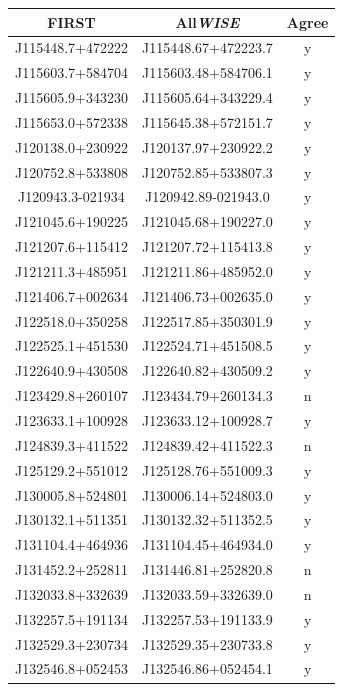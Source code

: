 \begin{table}
    \scriptsize\centering
  \begin{tabular}{ccc}
        \hline\hline
        FIRST & All\emph{WISE} & Agree\\\hline
        J115448.7+472222 & J115448.67+472223.7 & y\\
        J115603.7+584704 & J115603.48+584706.1 & y\\
        J115605.9+343230 & J115605.64+343229.4 & y\\
        J115653.0+572338 & J115645.38+572151.7 & y\\
        J120138.0+230922 & J120137.97+230922.2 & y\\
        J120752.8+533808 & J120752.85+533807.3 & y\\
        J120943.3-021934 & J120942.89-021943.0 & y\\
        J121045.6+190225 & J121045.68+190227.0 & y\\
        J121207.6+115412 & J121207.72+115413.8 & y\\
        J121211.3+485951 & J121211.86+485952.0 & y\\
        J121406.7+002634 & J121406.73+002635.0 & y\\
        J122518.0+350258 & J122517.85+350301.9 & y\\
        J122525.1+451530 & J122524.71+451508.5 & y\\
        J122640.9+430508 & J122640.82+430509.2 & y\\
        J123429.8+260107 & J123434.79+260134.3 & n\\
        J123633.1+100928 & J123633.12+100928.7 & y\\
        J124839.3+411522 & J124839.42+411522.3 & n\\
        J125129.2+551012 & J125128.76+551009.3 & y\\
        J130005.8+524801 & J130006.14+524803.0 & y\\
        J130132.1+511351 & J130132.32+511352.5 & y\\
        J131104.4+464936 & J131104.45+464934.0 & y\\
        J131452.2+252811 & J131446.81+252820.8 & n\\
        J132033.8+332639 & J132033.59+332639.0 & n\\
        J132257.5+191134 & J132257.53+191133.9 & y\\
        J132529.3+230734 & J132529.35+230733.8 & y\\
        J132546.8+052453 & J132546.86+052454.1 & y\\

\end{tabular}
\end{table}
